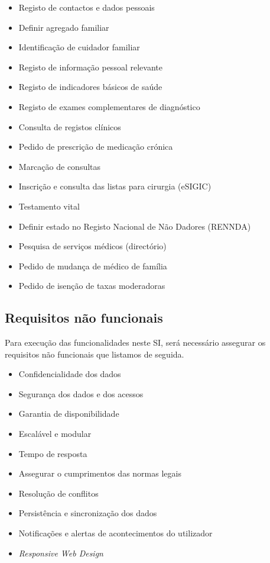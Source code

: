 \documentclass[12pt, a4paper, twoside]{report} %
\begin{document}
\begin{itemize}
\item Registo de contactos e dados pessoais
\item Definir agregado familiar 
\item Identificação de cuidador familiar
\item Registo de informação pessoal relevante
\item Registo de indicadores básicos de saúde
\item Registo de exames complementares de diagnóstico
\item Consulta de registos clínicos
\item Pedido de prescrição de medicação crónica
\item Marcação de consultas
\item Inscrição e consulta das listas para cirurgia (eSIGIC)
\item Testamento vital
\item Definir estado no Registo Nacional de Não Dadores (RENNDA)
\item Pesquisa de serviços médicos (directório)
\item Pedido de mudança de médico de família
\item Pedido de isenção de taxas moderadoras

\end{itemize}

\subsection{Requisitos não funcionais}

Para execução das funcionalidades neste SI, será necessário assegurar os requisitos não funcionais que listamos de seguida.

\begin{itemize}
\item Confidencialidade dos dados
\item Segurança dos dados e dos acessos
\item Garantia de disponibilidade
\item Escalável e modular
\item Tempo de resposta
\item Assegurar o cumprimentos das normas legais
\item Resolução de conflitos
\item Persistência e sincronização dos dados
\item Notificações e alertas de acontecimentos do utilizador
\item \textit {Responsive Web Design}
\end{itemize}
\end{document}
